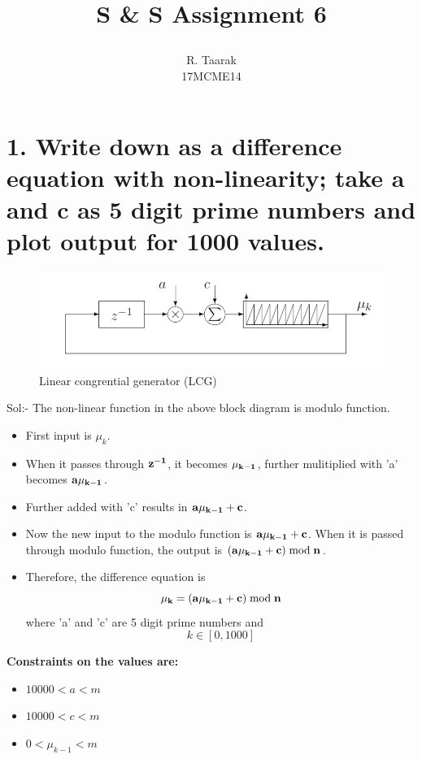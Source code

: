 \documentclass[a4paper,10pt]{article}
\title{
  \begin{large}
    S \& S Assignment 6
  \end{large}
}
\author{R. Taarak\\ 17MCME14}
\begin{document}
\maketitle

\section{1. Write down as a difference equation with non-linearity; take a and c as 5 digit prime numbers and plot output for 1000 values.}
  \begin{figure}[!hbt]
    \centering
      \includegraphics[scale=0.65]{image002.png}
    \caption{Linear congrential generator (LCG)}
  \end{figure}

  \Large{Sol:- }
  The non-linear function in the above block diagram is modulo function. 

\begin{itemize}
 \item First input is $\mu_k$.
 \item When it passes through \Large{$\bf{z^{-1}}$}, it becomes $\bf{\mu_{k-1}}$, further mulitiplied with 'a' becomes $\bf{a\mu_{k-1}}$.
 \item Further added with 'c' results in $\bf{a\mu_{k-1}+c}$.
 \item Now the new input to the modulo function is $\bf{a\mu_{k-1}+c}$. When it is passed through modulo function, the output is $\bf{(a\mu_{k-1}+c)\bmod n}$.
 \item Therefore, the difference equation is \[\bf{\mu_k = (a\mu_{k-1}+c)\bmod n}\] where 'a' and 'c' are 5 digit prime numbers and \[ k \in [0, 1000] \]
\end{itemize}

 \Large{\bf{Constraints on the values are: }}
\begin{itemize}
 \item $10000 < a < m$
 \item $10000 < c < m$
 \item $0 < \mu_{k-1} < m$
\end{itemize}
\end{document}
